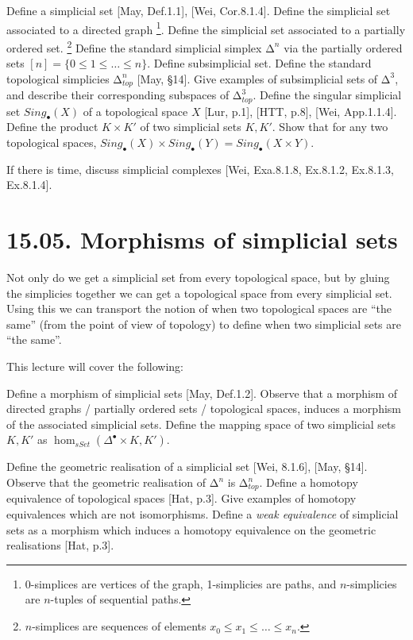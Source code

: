 \documentclass[a4paper]{amsart}
\numberwithin{figure}{section}
\theoremstyle{theorem}
\theoremstyle{definition}
\begin{document}
Define a simplicial set [May, Def.1.1], [Wei, Cor.8.1.4]. %
Define the simplicial set associated to a directed graph%
\footnote{0-simplices are vertices of the graph, 1-simplicies are paths, and $n$-simplicies are $n$-tuples of sequential paths.}. %
Define the simplicial set associated to a partially ordered set.%
\footnote{$n$-simplices are sequences of elements $x_0 \leq x_1 \leq \dots \leq x_n$.} %
Define the standard simplicial simplex $∆^n$ via the partially ordered sets $[n] = \{ 0 \leq 1 \leq \dots \leq n\}$. %
Define subsimplicial set. %
Define the standard topological simplicies $∆^n_{top}$ [May, §14]. %
Give examples of subsimplicial sets of $∆^3$, and describe their corresponding subspaces of $∆^3_{top}$. %
Define the singular simplicial set $Sing_\bullet(X)$ of a topological space $X$ [Lur, p.1], [HTT, p.8], [Wei, App.1.1.4]. %
Define the product $K \times K'$ of two simplicial sets $K, K'$. %
Show that for any two topological spaces, $Sing_\bullet(X) \times Sing_\bullet(Y) = Sing_\bullet(X \times Y)$. %

If there is time, discuss simplicial complexes [Wei, Exa.8.1.8, Ex.8.1.2, Ex.8.1.3, Ex.8.1.4].

\section{15.05. Morphisms of simplicial sets}

Not only do we get a simplicial set from every topological space, but by gluing the simplicies together we can get a topological space from every simplicial set. Using this we can transport the notion of when two topological spaces are ``the same'' (from the point of view of topology) to define when two simplicial sets are ``the same''.

This lecture will cover the following: 

Define a morphism of simplicial sets [May, Def.1.2]. %
Observe that a morphism of directed graphs / partially ordered sets / topological spaces, induces a morphism of the associated simplicial sets. %
Define the mapping space of two simplicial sets $K, K'$ as $\hom_{sSet}(\Delta^\bullet \times K, K')$. %

Define the geometric realisation of a simplicial set [Wei, 8.1.6], [May, §14]. %
Observe that the geometric realisation of $∆^n$ is $∆_{top}^n$. %
Define a homotopy equivalence of topological spaces [Hat, p.3]. %
Give examples of homotopy equivalences which are not isomorphisms. %
Define a \emph{weak equivalence} of simplicial sets as a morphism which induces a homotopy equivalence on the geometric realisations [Hat, p.3]. %
\end{document}
